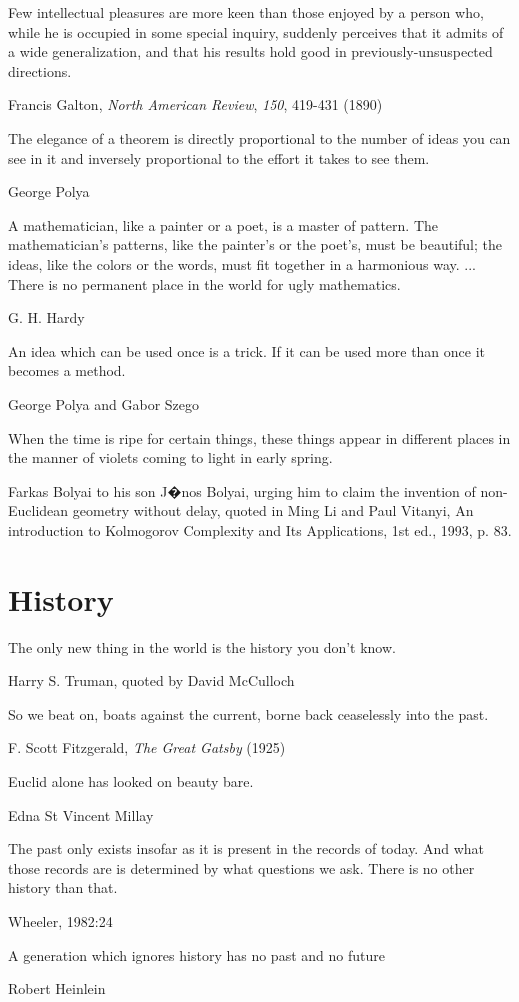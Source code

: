 \epigraph{Few intellectual pleasures are more keen than those enjoyed by a person who, while he is occupied in some special inquiry, suddenly perceives that it admits of a wide generalization, and that his results hold good in previously-unsuspected directions.}{Francis Galton, \emph{North American Review}, \emph{150}, 419-431 (1890)}

\epigraph{The elegance of a theorem is directly proportional to the number of ideas you can see in it and inversely proportional to the effort it takes to see them.}{George Polya}

\epigraph{A mathematician, like a painter or a poet, is a master of pattern. The mathematician's patterns, like the painter's or the poet's, must be beautiful; the ideas, like the colors or the words, must fit together in a harmonious way. ... There is no permanent place in the world for ugly mathematics.}{G. H. Hardy}

\epigraph{An idea which can be used once is a trick. If it can be used more than once it becomes a method.}{George Polya and Gabor Szego}


\epigraph{When the time is ripe for certain things, these things appear in different places in the manner of violets coming to light in early spring.}{Farkas Bolyai to his son J�nos Bolyai, urging him to claim the invention of non-Euclidean geometry without delay, quoted in Ming Li and Paul Vitanyi, An introduction to Kolmogorov Complexity and Its Applications, 1st ed., 1993, p. 83.}


\section{History}
\epigraph{The only new thing in the world is the history you don't know.}{Harry S. Truman, quoted by David McCulloch}

\epigraph{So we beat on, boats against the current, borne back ceaselessly into the past.}{F. Scott Fitzgerald, \emph{The Great Gatsby} (1925)}

\epigraph{Euclid alone has looked on beauty bare.}{Edna St Vincent Millay}

\epigraph{The past only exists insofar as it is present in the records of today. And what those records are is determined by what questions we ask.  There is no other history than that.}{Wheeler, 1982:24}

\epigraph{A generation which ignores history has no past and no future}{Robert Heinlein} %


